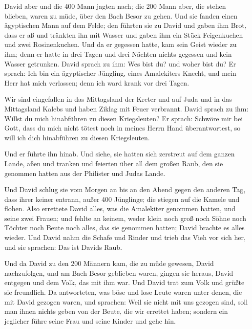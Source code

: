  David aber und die 400 Mann jagten nach; die 200 Mann
aber, die stehen blieben, waren zu müde, über den Bach Besor zu gehen.
 Und sie fanden einen ägyptischen Mann auf dem Felde; den
führten sie zu David und gaben ihm Brot, dass er aß und tränkten ihn mit
Wasser  und gaben ihm ein Stück Feigenkuchen und zwei
Rosinenkuchen. Und da er gegessen hatte, kam sein Geist wieder zu ihm;
denn er hatte in drei Tagen und drei Nächten nichts gegessen und kein
Wasser getrunken.  David sprach zu ihm: Wes bist du? und
woher bist du? Er sprach: Ich bin ein ägyptischer Jüngling, eines
Amalekiters Knecht, und mein Herr hat mich verlassen; denn ich ward
krank vor drei Tagen.

 Wir sind eingefallen in das Mittagsland der Kreter und
auf Juda und in das Mittagsland Kalebs und haben Ziklag mit Feuer
verbrannt.  David sprach zu ihm: Willst du mich
hinabführen zu diesen Kriegsleuten? Er sprach: Schwöre mir bei Gott,
dass du mich nicht tötest noch in meines Herrn Hand überantwortest, so
will ich dich hinabführen zu diesen Kriegsleuten.

 Und er führte ihn hinab. Und siehe, sie hatten sich
zerstreut auf dem ganzen Lande, aßen und tranken und feierten über all
dem großen Raub, den sie genommen hatten aus der Philister und Judas
Lande.

 Und David schlug sie vom Morgen an bis an den Abend
gegen den anderen Tag, dass ihrer keiner entrann, außer 400 Jünglinge;
die stiegen auf die Kamele und flohen.  Also errettete
David alles, was die Amalekiter genommen hatten, und seine zwei Frauen;
 und fehlte an keinem, weder klein noch groß noch Söhne
noch Töchter noch Beute noch alles, das sie genommen hatten; David
brachte es alles wieder.  Und David nahm die Schafe und
Rinder und trieb das Vieh vor sich her, und sie sprachen: Das ist Davids
Raub.

 Und da David zu den 200 Männern kam, die zu müde
gewesen, David nachzufolgen, und am Bach Besor geblieben waren, gingen
sie heraus, David entgegen und dem Volk, das mit ihm war. Und David trat
zum Volk und grüßte sie freundlich.  Da antworteten, was
böse und lose Leute waren unter denen, die mit David gezogen waren, und
sprachen: Weil sie nicht mit uns gezogen sind, soll man ihnen nichts
geben von der Beute, die wir errettet haben; sondern ein jeglicher führe
seine Frau und seine Kinder und gehe hin.

